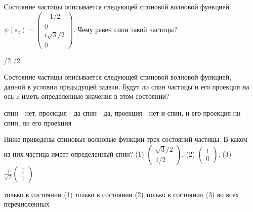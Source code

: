 \documentclass[11pt,a4paper]{exam}
\begin{document}
\begin{questions}
\question Состояние частицы описывается следующей спиновой волновой функцией 
$\psi ({s_z}) = \left( {\begin{array}{*{20}{c}}
{ - 1/2}\\
0\\
{i\sqrt 3 /2}\\
0
\end{array}} \right)$.
Чему равен спин такой частицы? 
\begin{choices}
/2      
/2      
\end{choices}

\question Состояние частицы описывается следующей спиновой волновой функцией, данной в условии предыдущей задачи. Будут ли спин частицы и его проекция на ось $z$ иметь определенные значения в этом состоянии? 
\begin{choices}
\choice спин - нет, проекция - да     
\choice спин - да, проекция - нет
\choice и спин, и его проекция     
\choice ни спин, ни его проекция
\end{choices}

\question Ниже приведены спиновые волновые функции трех состояний частицы. В каком из них частица имеет определенный спин?
(1) $\left( {\begin{array}{*{20}{c}}
{\sqrt 3 /2}\\
{1/2}
\end{array}} \right)$,  (2) $\left( {\begin{array}{*{20}{c}}
1\\
0
\end{array}} \right)$, (3) $\frac{1}{{\sqrt 2 }}\left( {\begin{array}{*{20}{c}}
1\\
1
\end{array}} \right)$
\begin{choices}
\choice только в состоянии (1)        
\choice только в состоянии (2)
\choice только в состоянии (3)        
\choice во всех перечисленных
\end{choices}


\end{questions}
\end{document}
